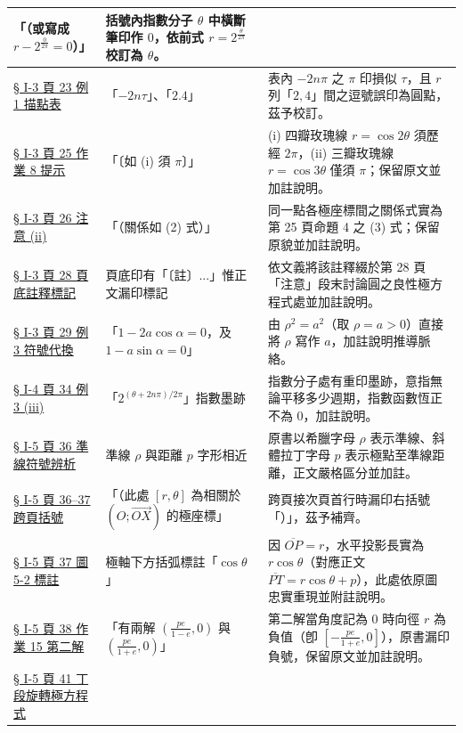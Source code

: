 \documentclass[a4paper,12pt,twoside]{article}
\begin{document}
\begin{xltabular}{\textwidth}{|p{3.2cm}|p{3.8cm}|X|}
「（或寫成 $r - 2^{\frac{0}{2\pi}} = 0$）」 & 
括號內指數分子 $\theta$ 中橫斷筆印作 $0$，依前式 $r = 2^{\frac{\theta}{2\pi}}$ 校訂為 $\theta$。 \\
\hline
\hyperref[note:b5s-ch1-p23-table]{§ I-3 頁 23 例 1 描點表} & 
「$-2n\tau$」、「$2.4$」 & 
表內 $-2n\pi$ 之 $\pi$ 印損似 $\tau$，且 $r$ 列「$2, 4$」間之逗號誤印為圓點，茲予校訂。 \\
\hline
\hyperref[note:b5s-ch1-p25-hw8]{§ I-3 頁 25 作業 8 提示} & 
「〔如 (i) 須 $\pi$〕」 & 
(i) 四瓣玫瑰線 $r=\cos 2\theta$ 須歷經 $2\pi$，(ii) 三瓣玫瑰線 $r=\cos 3\theta$ 僅須 $\pi$；保留原文並加註說明。 \\
\hline
\hyperref[note:b5s-ch1-p26-note]{§ I-3 頁 26 注意 (ii)} & 
「（關係如 (2) 式）」 & 
同一點各極座標間之關係式實為第 25 頁命題 4 之 (3) 式；保留原貌並加註說明。 \\
\hline
\hyperref[note:b5s-ch1-p28-fn]{§ I-3 頁 28 頁底註釋標記} & 
頁底印有「〔註〕...」惟正文漏印標記 & 
依文義將該註釋綴於第 28 頁「注意」段末討論圓之良性極方程式處並加註說明。 \\
\hline
\hyperref[note:b5s-ch1-p29-ex3]{§ I-3 頁 29 例 3 符號代換} & 
「$1 - 2a\cos\alpha = 0$，及 $1 - a\sin\alpha = 0$」 & 
由 $\rho^2 = a^2$（取 $\rho = a > 0$）直接將 $\rho$ 寫作 $a$，加註說明推導脈絡。 \\
\hline
\hyperref[note:b5s-ch1-p38-exp]{§ I-4 頁 34 例 3 (iii)} & 
「$2^{(\theta + 2n\pi)/2\pi}$」指數墨跡 & 
指數分子處有重印墨跡，意指無論平移多少週期，指數函數恆正不為 $0$，加註說明。 \\
\hline
\hyperref[note:b5s-ch1-p46-rho]{§ I-5 頁 36 準線符號辨析} & 
準線 $\rho$ 與距離 $p$ 字形相近 & 
原書以希臘字母 $\rho$ 表示準線、斜體拉丁字母 $p$ 表示極點至準線距離，正文嚴格區分並加註。 \\
\hline
\hyperref[note:b5s-ch1-p46-paren]{§ I-5 頁 36--37 跨頁括號} & 
「（此處 $[r, \theta]$ 為相關於 $(O; \vec{OX})$ 的極座標」 & 
跨頁接次頁首行時漏印右括號「）」，茲予補齊。 \\
\hline
\hyperref[note:b5s-ch1-p47-fig52]{§ I-5 頁 37 圖 5-2 標註} & 
極軸下方括弧標註「$\cos\theta$」 & 
因 $\overline{OP}=r$，水平投影長實為 $r\cos\theta$（對應正文 $\overline{PT}=r\cos\theta+p$），此處依原圖忠實重現並附註說明。 \\
\hline
\hyperref[note:b5s-ch1-p48-hw15]{§ I-5 頁 38 作業 15 第二解} & 
「有兩解 $(\frac{pe}{1-e}, 0)$ 與 $(\frac{pe}{1+e}, 0)$」 & 
第二解當角度記為 $0$ 時向徑 $r$ 為負值（卽 $[-\frac{pe}{1+e}, 0]$），原書漏印負號，保留原文並加註說明。 \\
\hline
\hyperref[note:b5s-ch1-p51-eq]{§ I-5 頁 41 丁段旋轉極方程式} & 

\end{xltabular}
\end{document}
